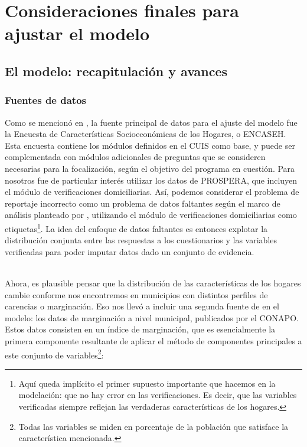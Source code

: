 \chapter{Consideraciones finales para ajustar el modelo}
\label{chap:ajuste}
\section*{El modelo: recapitulación y avances}
\subsection*{Fuentes de datos}
Como se mencionó en \cite{mzl_entregable_2}, la fuente principal de datos para el ajuste del modelo fue la Encuesta de Características Socioeconómicas de los Hogares, o ENCASEH. Esta encuesta contiene los módulos definidos en el CUIS como base, y puede ser complementada con módulos adicionales de preguntas que se consideren necesarias para la focalización, según el objetivo del programa en cuestión. Para nosotros fue de particular interés utilizar los datos de PROSPERA, que incluyen el módulo de verificaciones domiciliarias. Así, podemos considerar el problema de reportaje incorrecto como un problema de datos faltantes según el marco de análisis planteado por \cite{missing_data}, utilizando el módulo de verificaciones domiciliarias como etiquetas\footnote{Aquí queda implícito el primer supuesto importante que hacemos en la modelación: que no hay error en las verificaciones. Es decir, que las variables verificadas siempre reflejan las verdaderas características de los hogares.}. La idea del enfoque de datos faltantes es entonces explotar la distribución conjunta entre las respuestas a los cuestionarios y las variables verificadas para poder imputar datos dado un conjunto de evidencia.
\par
\noindent
\\
Ahora, es plausible pensar que la distribución de las características de los hogares cambie conforme nos encontremos en municipios con distintos perfiles de carencias o marginación. Eso nos llevó a incluir una segunda fuente de en el modelo: los datos de marginación a nivel municipal, publicados por el CONAPO. Estos datos consisten en un índice de marginación, que es esencialmente la primera componente resultante de aplicar el método de componentes principales a este conjunto de variables\footnote{Todas las variables se miden en porcentaje de la población que satisface la característica mencionada.}:

